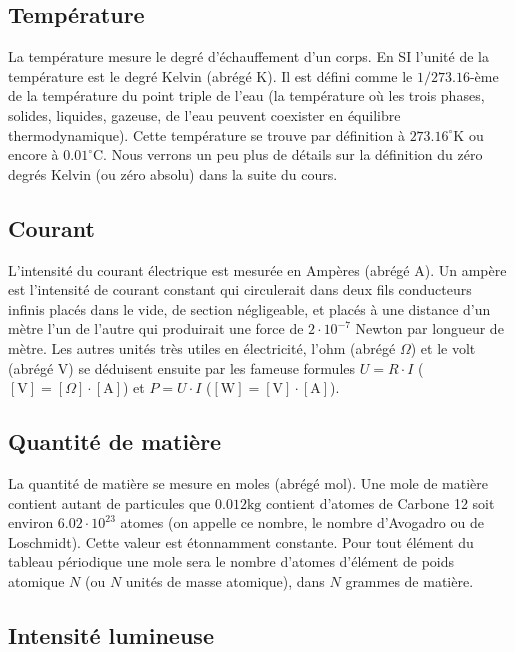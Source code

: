 \documentclass[a4paper,12pt]{book}
\newcommand{\mol}{\mathrm{mol}}
\newcommand{\kg}{\mathrm{kg}}
\newcommand{\K}{\mathrm{K}}
\newcommand{\C}{\mathrm{C}}
\newcommand{\A}{\mathrm{A}}
\newcommand{\V}{\mathrm{V}}
\newcommand{\W}{\mathrm{W}}
\begin{document}
\subsection{Température}

La température mesure le degré d'échauffement d'un corps. En SI l'unité de la température est le degré Kelvin (abrégé $\K$).
Il est défini comme le $1/273.16$-ème de la température du point triple de l'eau (la température où les trois phases, solides, liquides, gazeuse, de l'eau 
peuvent coexister en équilibre thermodynamique). Cette température se trouve par définition à $273.16^\circ\K$ ou encore à $0.01^\circ\C$.
Nous verrons un peu plus de détails sur la définition du zéro degrés Kelvin (ou zéro absolu) dans la suite du cours.

\subsection{Courant}

L'intensité du courant électrique est mesurée en Ampères (abrégé $\A$). Un ampère est l'intensité de courant constant qui circulerait 
dans deux fils conducteurs infinis placés dans le vide, de section négligeable, et placés à une distance d'un mètre l'un de l'autre 
qui produirait une force de $2\cdot 10^{-7}$ Newton par longueur de mètre. Les autres unités très utiles en électricité, l'ohm (abrégé $\Omega$) et 
le volt (abrégé $\V$) se déduisent ensuite par les fameuse formules $U=R\cdot I$ ($[\V]=[\Omega]\cdot [\A]$) et $P=U\cdot I$ ($[\W]=[\V]\cdot [\A]$).

\subsection{Quantité de matière}

La quantité de matière se mesure en moles (abrégé $\mol$). Une mole de matière contient autant de particules que 
$0.012\kg$ contient d'atomes de Carbone 12 soit environ $6.02\cdot 10^{23}$ atomes (on appelle ce nombre, le nombre d'Avogadro ou de Loschmidt). 
Cette valeur est étonnamment constante. Pour
tout élément du tableau périodique une mole sera le nombre d'atomes d'élément de poids atomique $N$ (ou $N$ unités de masse atomique), dans $N$ grammes de matière.

\subsection{Intensité lumineuse}
\end{document}
